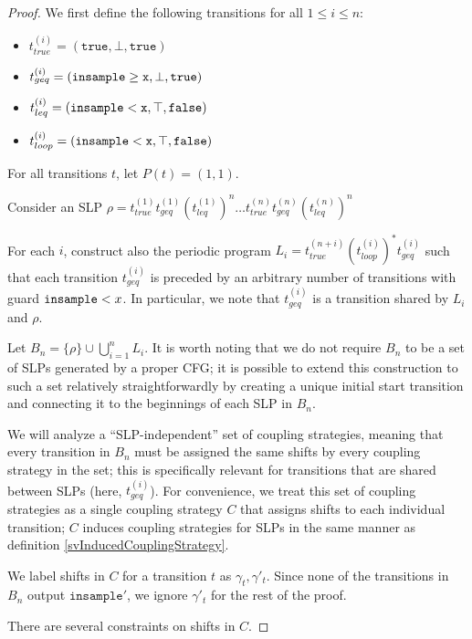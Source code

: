\begin{proof}
    We first define the following transitions for all $1\leq i\leq n$: \begin{itemize}
        \item $t_{true}^{(i)} = (\texttt{true}, \bot, \texttt{true})$
        \item $t_{geq}^{(i)} = (\gguard[\texttt{x}],\bot, \texttt{true})$
        \item $t_{leq}^{(i)} = (\lguard[\texttt{x}], \top, \texttt{false})$
        \item $t_{loop}^{(i)} = (\lguard[\texttt{x}], \top, \texttt{false})$
    \end{itemize}

    For all transitions $t$, let $P(t) = (1, 1)$. 


    Consider an SLP $\rho = t_{true}^{(1)} t_{geq}^{(1)} \left(t_{leq}^{(1)}\right)^n \dots t_{true}^{(n)} t_{geq}^{(n)} \left(t_{leq}^{(n)}\right)^n$

    For each $i$, construct also the periodic program $L_i = t_{true}^{(n + i)} \left(t_{loop}^{(i)}\right)^* t_{geq}^{(i)}$ such that each transition $t_{geq}^{(i)}$ is preceded by an arbitrary number of transitions with guard $\lguard$. In particular, we note that $t_{geq}^{(i)}$ is a transition shared by $L_i$ and $\rho$. 

    Let $B_n = \{\rho\}\cup \bigcup_{i=1}^n L_i$. It is worth noting that we do not require $B_n$ to be a set of SLPs generated by a proper CFG; it is possible to extend this construction to such a set relatively straightforwardly by creating a unique initial start transition and connecting it to the beginnings of each SLP in $B_n$.
    
    We will analyze a ``SLP-independent'' set of coupling strategies, meaning that every transition in $B_n$ must be assigned the same shifts by every coupling strategy in the set; this is specifically relevant for transitions that are shared between SLPs (here, $t_{geq}^{(i)}$). 
    For convenience, we treat this set of coupling strategies as a single coupling strategy $C$ that assigns shifts to each individual transition; $C$ induces coupling strategies for SLPs in the same manner as definition \ref{svInducedCouplingStrategy}. 

    We label shifts in $C$ for a transition $t$ as $\gamma_t, \gamma'_t$. Since none of the transitions in $B_n$ output $\texttt{insample}'$, we ignore $\gamma'_t$ for the rest of the proof. 

    There are several constraints on shifts in $C$. 


\end{proof}
